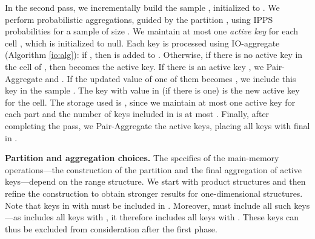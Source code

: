 \documentclass[11pt]{article}
\begin{document}
In the second pass, we incrementally 
build the sample , initialized to . 
We 
perform probabilistic aggregations, guided by the partition ,
using IPPS probabilities for a sample of size . 
We maintain at most one {\em active key}  for each cell , which is initialized to null.
Each key  is processed using {\sc IO-aggregate} (Algorithm \ref{io:alg}): if , then  is added to . Otherwise,
if there is no active key in the cell  of
, then  becomes the active key.  
If there is an active key , we {\sc Pair-Aggregate}  and . 
If the updated  value of one of them becomes , we include this
key in the sample .  
The key with  value in  (if there is one) is the new active
key for the cell. 
The storage used is , since we maintain at most one active
key for each part and the number of keys included in  is at most
.
Finally, after completing the pass, we {\sc Pair-Aggregate}
the  active keys, placing all keys with final  in .


\medskip
\noindent
{\bf Partition and aggregation choices.}
The specifics of the main-memory operations---the construction
of the partition and the final aggregation of active keys---depend on
the range structure.
We start with product structures and then refine the construction to
 obtain stronger results for one-dimensional structures. 
Note that keys in  with  must be included in .  Moreover,  must include all such keys---as  includes all keys with
, 
 it therefore includes all keys with .  These keys can thus be 
excluded from consideration after the first phase.
\end{document}
